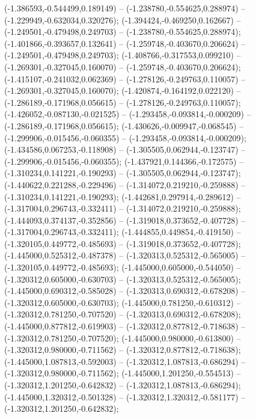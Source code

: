  (-1.386593,-0.544499,0.189149) -- (-1.238780,-0.554625,0.288974) -- (-1.229949,-0.632034,0.320276);
 (-1.394424,-0.469250,0.162667) -- (-1.249501,-0.479498,0.249703) -- (-1.238780,-0.554625,0.288974);
 (-1.401866,-0.393657,0.132641) -- (-1.259748,-0.403670,0.206624) -- (-1.249501,-0.479498,0.249703);
 (-1.408766,-0.317553,0.099210) -- (-1.269301,-0.327045,0.160070) -- (-1.259748,-0.403670,0.206624);
 (-1.415107,-0.241032,0.062369) -- (-1.278126,-0.249763,0.110057) -- (-1.269301,-0.327045,0.160070);
 (-1.420874,-0.164192,0.022120) -- (-1.286189,-0.171968,0.056615) -- (-1.278126,-0.249763,0.110057);
 (-1.426052,-0.087130,-0.021525) -- (-1.293458,-0.093814,-0.000209) -- (-1.286189,-0.171968,0.056615);
 (-1.430626,-0.009947,-0.068545) -- (-1.299906,-0.015456,-0.060355) -- (-1.293458,-0.093814,-0.000209);
 (-1.434586,0.067253,-0.118908) -- (-1.305505,0.062944,-0.123747) -- (-1.299906,-0.015456,-0.060355);
 (-1.437921,0.144366,-0.172575) -- (-1.310234,0.141221,-0.190293) -- (-1.305505,0.062944,-0.123747);
 (-1.440622,0.221288,-0.229496) -- (-1.314072,0.219210,-0.259888) -- (-1.310234,0.141221,-0.190293);
 (-1.442681,0.297914,-0.289612) -- (-1.317004,0.296743,-0.332411) -- (-1.314072,0.219210,-0.259888);
 (-1.444093,0.374137,-0.352856) -- (-1.319018,0.373652,-0.407728) -- (-1.317004,0.296743,-0.332411);
 (-1.444855,0.449854,-0.419150) -- (-1.320105,0.449772,-0.485693) -- (-1.319018,0.373652,-0.407728);
 (-1.445000,0.525312,-0.487378) -- (-1.320313,0.525312,-0.565005) -- (-1.320105,0.449772,-0.485693);
 (-1.445000,0.605000,-0.544050) -- (-1.320312,0.605000,-0.630703) -- (-1.320313,0.525312,-0.565005);
 (-1.445000,0.690312,-0.585028) -- (-1.320313,0.690312,-0.678208) -- (-1.320312,0.605000,-0.630703);
 (-1.445000,0.781250,-0.610312) -- (-1.320312,0.781250,-0.707520) -- (-1.320313,0.690312,-0.678208);
 (-1.445000,0.877812,-0.619903) -- (-1.320312,0.877812,-0.718638) -- (-1.320312,0.781250,-0.707520);
 (-1.445000,0.980000,-0.613800) -- (-1.320312,0.980000,-0.711562) -- (-1.320312,0.877812,-0.718638);
 (-1.445000,1.087813,-0.592003) -- (-1.320312,1.087813,-0.686294) -- (-1.320312,0.980000,-0.711562);
 (-1.445000,1.201250,-0.554513) -- (-1.320312,1.201250,-0.642832) -- (-1.320312,1.087813,-0.686294);
 (-1.445000,1.320312,-0.501328) -- (-1.320312,1.320312,-0.581177) -- (-1.320312,1.201250,-0.642832);
